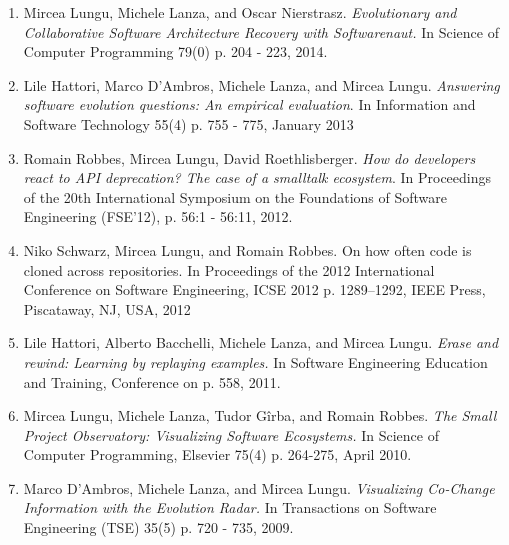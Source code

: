 
\begin{enumerate}
\item Mircea Lungu, Michele Lanza, and Oscar Nierstrasz. \emph{Evolutionary and Collaborative Software Architecture Recovery with Softwarenaut.}  In Science of Computer Programming 79(0) p. 204 - 223, 2014.

\item Lile Hattori, Marco D'Ambros, Michele Lanza, and Mircea Lungu. \emph{Answering software evolution questions: An empirical evaluation}. In Information and Software Technology 55(4) p. 755 - 775, January 2013

\item Romain Robbes, Mircea Lungu, David Roethlisberger. \emph{How do developers react to API deprecation? The case of a smalltalk ecosystem}. In Proceedings of the 20th International Symposium on the	 Foundations of Software Engineering (FSE'12), p. 56:1 - 56:11, 2012.

\item Niko Schwarz, Mircea Lungu, and Romain Robbes. On how often code is cloned across repositories. In Proceedings of the 2012 International Conference on Software Engineering, ICSE 2012 p. 1289--1292, IEEE Press, Piscataway, NJ, USA, 2012

\item Lile Hattori, Alberto Bacchelli, Michele Lanza, and Mircea Lungu. \emph{Erase and rewind: Learning by replaying examples.} In Software Engineering Education and Training, Conference on p. 558, 2011.

\item Mircea Lungu, Michele Lanza, Tudor G\^irba, and Romain Robbes. \emph{The Small Project Observatory: Visualizing Software Ecosystems.} In Science of Computer Programming, Elsevier 75(4) p. 264-275, April 2010.

\item Marco D'Ambros, Michele Lanza, and Mircea Lungu. \emph{Visualizing Co-Change Information with the Evolution Radar.} In Transactions on Software Engineering (TSE) 35(5) p. 720 - 735, 2009.
\end{enumerate}




